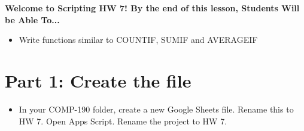 \documentclass{article}
\newcommand{\AName}{Scripting HW 7}
\begin{document}
\textbf{Welcome to \AName!  By the end of this lesson, Students Will be Able To...}
\begin{itemize}
    \item Write functions similar to COUNTIF, SUMIF and AVERAGEIF
\end{itemize}


\section*{Part 1: Create the file}
\begin{itemize}
    \item In your COMP-190 folder, create a new Google Sheets file.  Rename this to HW 7.  Open Apps Script.  Rename the project to HW 7.
\end{itemize}
\end{document}
